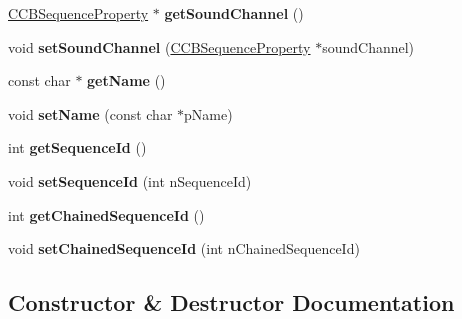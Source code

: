 \begin{DoxyCompactItemize}
\item 
\mbox{\label{classcocosbuilder_1_1CCBSequence_a2766c63d55e82d79c1d527ed7d1d90ab}} 
\hyperlink{classcocosbuilder_1_1CCBSequenceProperty}{C\+C\+B\+Sequence\+Property} $\ast$ {\bfseries get\+Sound\+Channel} ()
\item 
\mbox{\label{classcocosbuilder_1_1CCBSequence_a6ddaa00a46f60138832ccc61ac075bbc}} 
void {\bfseries set\+Sound\+Channel} (\hyperlink{classcocosbuilder_1_1CCBSequenceProperty}{C\+C\+B\+Sequence\+Property} $\ast$sound\+Channel)
\item 
\mbox{\label{classcocosbuilder_1_1CCBSequence_af04ad1645e40ca5112fd7dea88c13efb}} 
const char $\ast$ {\bfseries get\+Name} ()
\item 
\mbox{\label{classcocosbuilder_1_1CCBSequence_a143e989468951f096c4ed253a41a7baf}} 
void {\bfseries set\+Name} (const char $\ast$p\+Name)
\item 
\mbox{\label{classcocosbuilder_1_1CCBSequence_aef76e4700189aa03de7472f465fa4896}} 
int {\bfseries get\+Sequence\+Id} ()
\item 
\mbox{\label{classcocosbuilder_1_1CCBSequence_a7614e7beb913c27b00c78ef402a22771}} 
void {\bfseries set\+Sequence\+Id} (int n\+Sequence\+Id)
\item 
\mbox{\label{classcocosbuilder_1_1CCBSequence_a5e9f9575f1914e718f717d57b4143db6}} 
int {\bfseries get\+Chained\+Sequence\+Id} ()
\item 
\mbox{\label{classcocosbuilder_1_1CCBSequence_a332ae172ee08fc51e9258332e614b7a6}} 
void {\bfseries set\+Chained\+Sequence\+Id} (int n\+Chained\+Sequence\+Id)
\end{DoxyCompactItemize}


\subsection{Constructor \& Destructor Documentation}
\mbox{\label{classcocosbuilder_1_1CCBSequence_a1700cc0f94b98bf29f717e169b921c9c}} 
